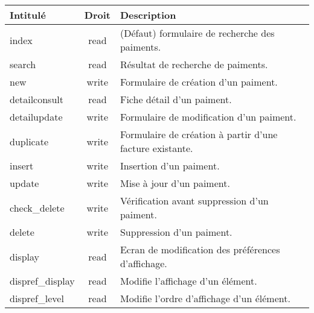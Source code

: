 \begin{tabular}{|l|c|p{9.5cm}|}
 \hline
 \textbf{Intitulé} & \textbf{Droit} & \textbf{Description} \\
 \hline
 \hline
  index & read & (Défaut) formulaire de recherche des paiments. \\ 
 \hline
  search & read & Résultat de recherche de paiments. \\
 \hline
  new & write & Formulaire de création d'un paiment. \\
 \hline
  detailconsult & read & Fiche détail d'un paiment. \\
 \hline
  detailupdate & write & Formulaire de modification d'un paiment. \\
 \hline
  duplicate & write & Formulaire de création à partir d'une facture existante. \\
 \hline
  insert & write & Insertion d'un paiment. \\
 \hline
  update & write & Mise à jour d'un paiment. \\
 \hline
  check\_delete & write & Vérification avant suppression d'un paiment. \\
 \hline
  delete & write & Suppression d'un paiment. \\
 \hline
  display & read & Ecran de modification des préférences d'affichage. \\
 \hline
  dispref\_display & read & Modifie l'affichage d'un élément. \\
 \hline
  dispref\_level & read & Modifie l'ordre d'affichage d'un élément. \\
 \hline
\end{tabular}
